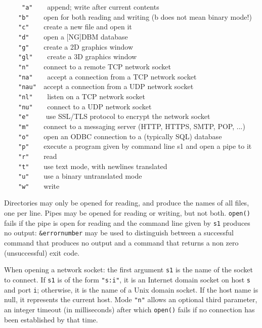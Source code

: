 \ \ \ \ \ \texttt{"a"\ \ \ \ }append; write
after current contents\\
 \ \ \ \ \texttt{"b"\ \ \ \ }open for both
reading and writing (b does not mean binary mode!)\\
 \ \ \ \ \texttt{"c"\ \ \ \ }create a new
file and open it\\
 \ \ \ \ \texttt{"d"\ \ \ \ }open a
[NG]DBM database\\
 \ \ \ \ \texttt{"g"\ \ \ \ }create a 2D
graphics window\\
 \ \ \ \ \texttt{"gl"\ \ \ \ }create a 3D
graphics window\\
 \ \ \ \ \texttt{"n"\ \ \ \ }connect to a
remote TCP network socket\\
 \ \ \ \ \texttt{"na"\ \ \ \ }accept a
connection from a TCP network socket \\
 \ \ \ \ \texttt{"nau"\ \ }accept a
connection from a UDP network socket\\
 \ \ \ \ \texttt{"nl"\ \ \ \ }listen on a
TCP network socket \\
 \ \ \ \ \texttt{"nu"\ \ \ \ }connect to a
UDP network socket\\
 \ \ \ \ \texttt{"e"\ \ \ \ } use SSL/TLS protocol to
encrypt the network socket\\
 \ \ \ \ \texttt{"m"\ \ \ \ }connect to a
messaging server (HTTP, HTTPS, SMTP, POP, ...)\\
 \ \ \ \ \texttt{"o"\ \ \ \ }open an
ODBC connection to a (typically SQL)
database\\
 \ \ \ \ \texttt{"p"\ \ \ \ }execute a
program given by command line s1 and open a pipe to it\\
 \ \ \ \ \texttt{"r"\ \ \ \ }read\\
 \ \ \ \ \texttt{"t"\ \ \ \ }use text mode,
with newlines translated\\
 \ \ \ \ \texttt{"u"\ \ \ \ }use a binary
untranslated mode\\
 \ \ \ \ \texttt{"w"\ \ \ \ }write

Directories may only be opened for reading, and produce the names of all
files, one per line. Pipes may be opened for reading or writing, but
not both. \texttt{open()} fails if the pipe is open for reading and
the command line given by \texttt{s1} produces no output:
\texttt{\&errornumber} may be used to distinguish between a successful
command that produces no output and a command that returns a non zero
(unsuccessful) exit code.

When opening a network socket: the first argument \texttt{s1} is the
name of the socket to connect. If \texttt{s1} is of the form
\texttt{"s:i"}, it is an Internet domain socket on
host \texttt{s} and port \texttt{i}; otherwise, it is the name of a Unix
domain socket. If the host name is null, it represents the current
host. Mode \texttt{"n"} allows an optional third parameter,
an integer timeout (in milliseconds) after which \texttt{open()} fails
if no connection has been established by that time.


